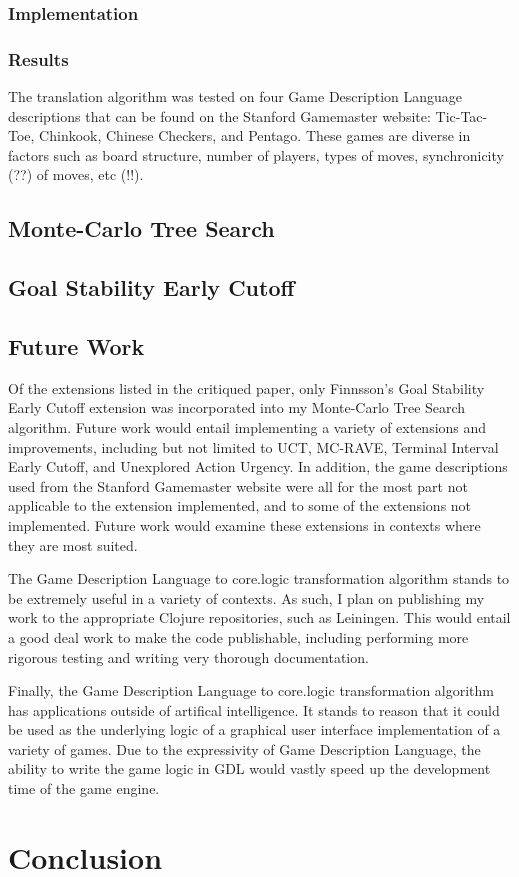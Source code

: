 \documentclass[letterpaper]{article}
\begin{document}
\subsubsection{Implementation}

\subsubsection{Results}
The translation algorithm was tested on four Game Description Language descriptions that can be found on the Stanford Gamemaster website: Tic-Tac-Toe, Chinkook, Chinese Checkers, and Pentago. These games are diverse in factors such as board structure, number of players, types of moves, synchronicity (??) of moves, etc (!!).

\subsection{Monte-Carlo Tree Search}

\subsection{Goal Stability Early Cutoff}

\subsection{Future Work}

Of the extensions listed in the critiqued paper, only Finnsson's Goal Stability Early Cutoff extension was incorporated into my Monte-Carlo Tree Search algorithm. Future work would entail implementing a variety of extensions and improvements, including but not limited to UCT, MC-RAVE, Terminal Interval Early Cutoff, and Unexplored Action Urgency. In addition, the game descriptions used from the Stanford Gamemaster website were all for the most part not applicable to the extension implemented, and to some of the extensions not implemented. Future work would examine these extensions in contexts where they are most suited.

The Game Description Language to core.logic transformation algorithm stands to be extremely useful in a variety of contexts. As such, I plan on publishing my work to the appropriate Clojure repositories, such as Leiningen. This would entail a good deal work to make the code publishable, including performing more rigorous testing and writing very thorough documentation.

Finally, the Game Description Language to core.logic transformation algorithm has applications outside of artifical intelligence. It stands to reason that it could be used as the underlying logic of a graphical user interface implementation of a variety of games. Due to the expressivity of Game Description Language, the ability to write the game logic in GDL would vastly speed up the development time of the game engine.

\section{Conclusion}



\end{document}
